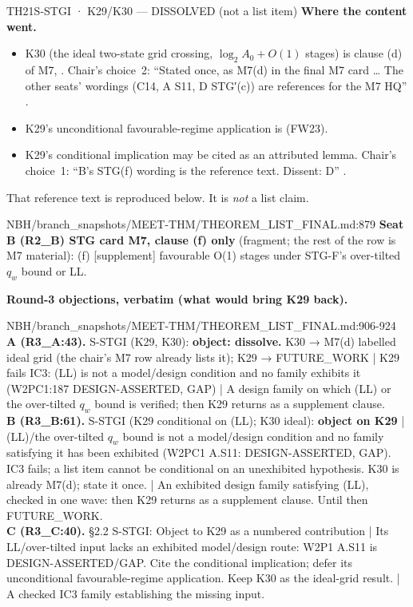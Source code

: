 \begin{card}{TH21}{S-STGI · K29/K30 — DISSOLVED (not a list item)}
\textbf{Where the content went.}
\begin{itemize}
\item K30 (the ideal two-state grid crossing, $\log_2A_0+O(1)$ stages) is clause (d) of M7, . Chair's choice~2: ``Stated once, as M7(d) in the final M7 card \ldots{} The other seats' wordings (C14, A S11, D STG′(c)) are references for the M7 HQ'' .
\item K29's unconditional favourable-regime application is  (FW23).
\item K29's conditional implication may be cited as an attributed lemma. Chair's choice~1: ``B's STG(f) wording is the reference text. Dissent: D'' .
\end{itemize}
That reference text is reproduced below. It is \emph{not} a list claim.
\begin{stmt}{NBH/branch_snapshots/MEET-THM/THEOREM_LIST_FINAL.md:879}
\textbf{Seat B (R2\_B) STG card M7, clause (f) only} (fragment; the rest of the row is M7 material): (f) [supplement] favourable O(1) stages under STG-F's over-tilted $q_w$ bound or LL.
\end{stmt}
\textbf{Round-3 objections, verbatim (what would bring K29 back).}
\begin{stmt}{NBH/branch_snapshots/MEET-THM/THEOREM_LIST_FINAL.md:906-924}
\textbf{A (R3\_A:43).} S-STGI (K29, K30): \textbf{object: dissolve.} K30 → M7(d) labelled ideal grid (the chair's M7 row already lists it); K29 → FUTURE\_WORK | K29 fails IC3: (LL) is not a model/design condition and no family exhibits it (W2PC1:187 DESIGN-ASSERTED, GAP) | A design family on which (LL) or the over-tilted $q_w$ bound is verified; then K29 returns as a supplement clause.\\
\textbf{B (R3\_B:61).} S-STGI (K29 conditional on (LL); K30 ideal): \textbf{object on K29} | (LL)/the over-tilted $q_w$ bound is not a model/design condition and no family satisfying it has been exhibited (W2PC1 A.S11: DESIGN-ASSERTED, GAP). IC3 fails; a list item cannot be conditional on an unexhibited hypothesis. K30 is already M7(d); state it once. | An exhibited design family satisfying (LL), checked in one wave: then K29 returns as a supplement clause. Until then FUTURE\_WORK.\\
\textbf{C (R3\_C:40).} §2.2 S-STGI: Object to K29 as a numbered contribution | Its LL/over-tilted input lacks an exhibited model/design route: W2P1 A.S11 is DESIGN-ASSERTED/GAP. Cite the conditional implication; defer its unconditional favourable-regime application. Keep K30 as the ideal-grid result. | A checked IC3 family establishing the missing input.\\

\end{stmt}
\end{card}
